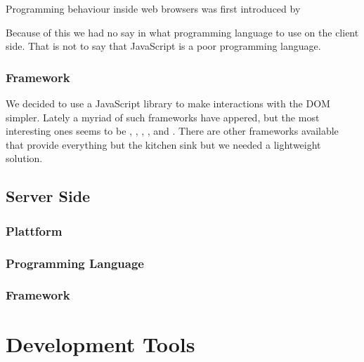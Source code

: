 Programming behaviour inside web browsers was first introduced by

Because of this we had no say in what programming language to use on the
client side. That is not to say that JavaScript is a poor programming
language.

\subsubsection{Framework}

We decided to use a JavaScript library to make interactions with the DOM
simpler. Lately a myriad of such frameworks have appered, but the most
interesting ones seems to be
%
,
%
,
%
,
%
, and
%
.
There are other frameworks available that provide everything but the kitchen
sink but we needed a lightweight solution.


\subsection{Server Side}

\subsubsection{Plattform}

\subsubsection{Programming Language}

\subsubsection{Framework}

\section{Development Tools}

